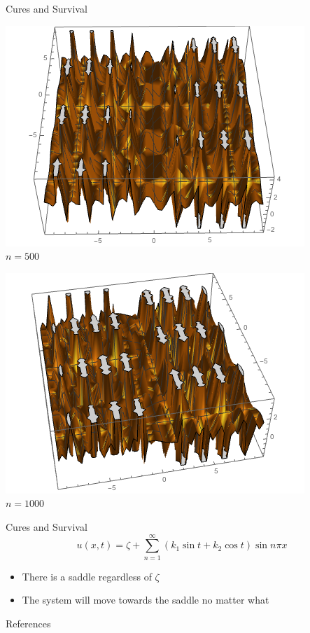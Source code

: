 \documentclass{beamer}
\begin{document}
\begin{frame}{Cures and Survival}
\begin{center}
\begin{minipage}{0.4\textwidth}
\pause\includegraphics[scale=0.3]{cure_0201}\\
$n=500$
\end{minipage}
\begin{minipage}{0.4\textwidth}
\pause\includegraphics[scale=0.3]{cure_03}\\
$n=1000$
\end{minipage}

\end{center}
\end{frame}

\begin{frame}{Cures and Survival}
\[
u(x,t)=\zeta+\sum_{n=1}^{\infty}(k_{1}\sin{t}+k_{2}\cos{t})\sin{n\pi x}
\]
\begin{itemize}
\item There is a saddle regardless of $\zeta$
\pause
\item The system will move towards the saddle no matter what
\end{itemize}
\end{frame}

\begin{frame}{References}

\end{frame}
\end{document}
